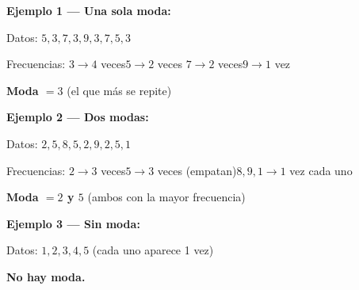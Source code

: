 \documentclass[12pt, letterpaper]{article}
\begin{document}
	\begin{ejemplo}
		\textbf{Ejemplo 1 — Una sola moda:}
		
		Datos: $5, 3, 7, 3, 9, 3, 7, 5, 3$
		
		Frecuencias: \quad $3 \to 4$ veces\quad $5 \to 2$ veces
		\quad $7 \to 2$ veces\quad $9 \to 1$ vez
		
		\textbf{Moda $= 3$} (el que más se repite)
		
		\vspace{0.4cm}
		\textbf{Ejemplo 2 — Dos modas:}
		
		Datos: $2, 5, 8, 5, 2, 9, 2, 5, 1$
		
		Frecuencias: \quad $2 \to 3$ veces\quad $5 \to 3$ veces
		(empatan)\quad $8, 9, 1 \to 1$ vez cada uno
		
		\textbf{Moda $= 2$ y $5$} (ambos con la mayor frecuencia)
		
		\vspace{0.4cm}
		\textbf{Ejemplo 3 — Sin moda:}
		
		Datos: $1, 2, 3, 4, 5$ (cada uno aparece 1 vez)
		
		\textbf{No hay moda.}
	\end{ejemplo}
	
\end{document}
